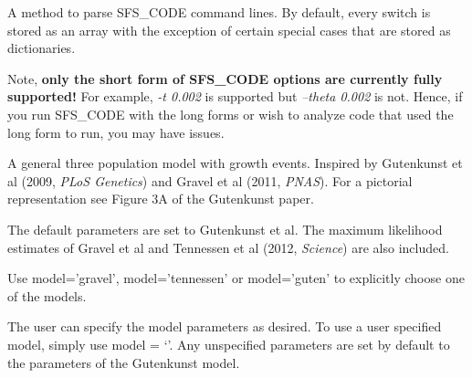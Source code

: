 \documentclass[letterpaper,10pt,english]{sphinxmanual}
\begin{document}
\begin{fulllineitems}
\begin{fulllineitems}
\end{fulllineitems}


\begin{fulllineitems}
\label{index:command.SFSCommand.parse_string}
A method to parse SFS\_CODE command lines.  By default, every switch
is stored as an array with the exception of certain special cases that
are stored as dictionaries.

Note, \textbf{only the short form of SFS\_CODE options are currently fully 
supported!}  For example, \emph{-t 0.002} is supported but \emph{--theta 0.002}
is not. Hence, if you run SFS\_CODE with the long forms or wish to 
analyze code that used the long form to run, you may have issues.

\end{fulllineitems}


\begin{fulllineitems}
\label{index:command.SFSCommand.three_pop}
A general three population model with growth events.
Inspired by Gutenkunst et al (2009, \emph{PLoS Genetics})
and Gravel et al (2011, \emph{PNAS}).  For a pictorial 
representation see Figure 3A of the Gutenkunst paper.

The default parameters are set to Gutenkunst et al.
The maximum likelihood estimates of Gravel et al
and Tennessen et al (2012, \emph{Science}) are also 
included.

Use model='gravel', model='tennessen' or model='guten'
to explicitly choose one of the models.

The user can specify the model parameters as desired.
To use a user specified model, simply use model = `'.
Any unspecified parameters are set by default to the 
parameters of the Gutenkunst model.

\end{fulllineitems}


\end{fulllineitems}
\end{document}

